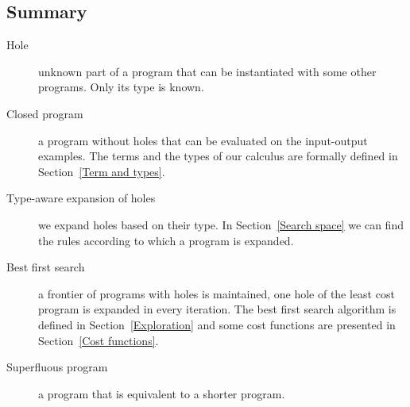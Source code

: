 \subsection{Summary}
\begin{description}
\item[Hole] unknown part of a program that can be instantiated with some other programs. Only its type is known.
\item[Closed program] a program without holes that can be evaluated on the input-output examples. The terms and the types of our calculus are formally defined in Section~\ref{Term and types}.
\item[Type-aware expansion of holes] we expand holes based on their type. In Section~\ref{Search space} we can find the rules according to which a program is expanded.
\item[Best first search] a frontier of programs with holes is maintained, one hole of the least cost program is expanded in every iteration. The best first search algorithm is defined in Section~\ref{Exploration} and some cost functions are presented in Section~\ref{Cost functions}.
\item[Superfluous program] a program that is equivalent to a shorter program.
\end{description}
